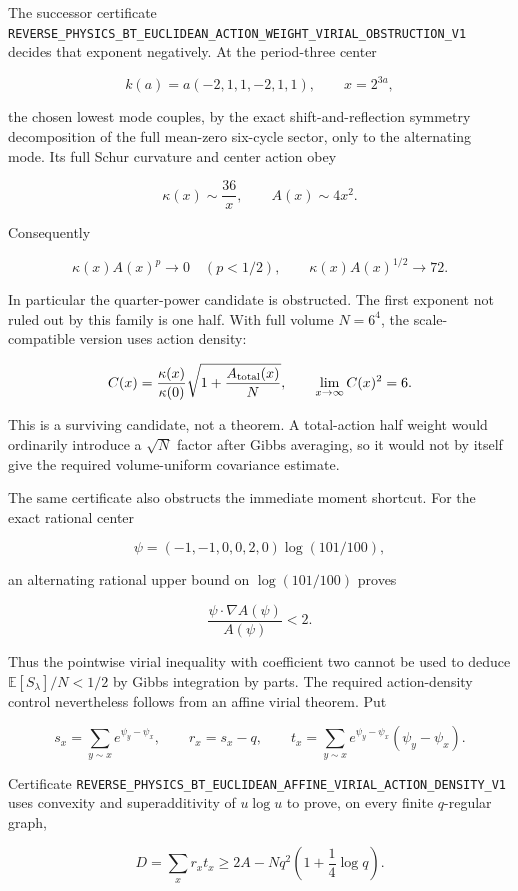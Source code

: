 \documentclass[11pt]{article}
\theoremstyle{definition}
\theoremstyle{remark}
\newcommand{\cert}[1]{\nolinkurl{#1}}
\begin{document}
The successor certificate
\cert{REVERSE_PHYSICS_BT_EUCLIDEAN_ACTION_WEIGHT_VIRIAL_OBSTRUCTION_V1}
decides that exponent negatively.  At the period-three center

\[
 k(a)=a(-2,1,1,-2,1,1),\qquad x=2^{3a},
\]

the chosen lowest mode couples, by the exact shift-and-reflection symmetry
decomposition of the full mean-zero six-cycle sector, only to the alternating
mode.  Its full Schur curvature and center action obey

\[
 \kappa(x)\sim\frac{36}{x},\qquad A(x)\sim4x^2.
\]

Consequently

\[
 \kappa(x)A(x)^p\longrightarrow0\quad(p<1/2),\qquad
 \kappa(x)A(x)^{1/2}\longrightarrow72.
\]

In particular the quarter-power candidate is obstructed.  The first exponent
not ruled out by this family is one half.  With full volume \(N=6^4\), the
scale-compatible version uses action density:

\[
 C(x)=\frac{\kappa(x)}{\kappa(0)}
       \sqrt{1+\frac{A_{\rm total}(x)}N},
 \qquad \lim_{x\to\infty}C(x)^2=6.
\]

This is a surviving candidate, not a theorem.  A total-action half weight
would ordinarily introduce a \(\sqrt N\) factor after Gibbs averaging, so it
would not by itself give the required volume-uniform covariance estimate.

The same certificate also obstructs the immediate moment shortcut.  For the
exact rational center

\[
 \psi=(-1,-1,0,0,2,0)\log(101/100),
\]

an alternating rational upper bound on \(\log(101/100)\) proves

\[
 \frac{\psi\cdot\nabla A(\psi)}{A(\psi)}<2.
\]

Thus the pointwise virial inequality with coefficient two cannot be used to
deduce \(\mathbb E[S_\lambda]/N<1/2\) by Gibbs integration by parts.  The
required action-density control nevertheless follows from an affine virial
theorem.  Put

\[
 s_x=\sum_{y\sim x}e^{\psi_y-\psi_x},\qquad r_x=s_x-q,
 \qquad t_x=\sum_{y\sim x}e^{\psi_y-\psi_x}(\psi_y-\psi_x).
\]

Certificate
\cert{REVERSE_PHYSICS_BT_EUCLIDEAN_AFFINE_VIRIAL_ACTION_DENSITY_V1}
uses convexity and superadditivity of \(u\log u\) to prove, on every finite
\(q\)-regular graph,

\[
 D=\sum_xr_xt_x
 \geq2A-Nq^2\left(1+\frac14\log q\right).
\]
\end{document}
